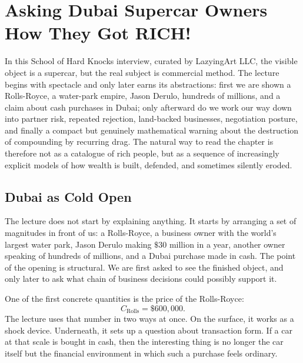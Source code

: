 \chapter{Asking Dubai Supercar Owners How They Got RICH!}

In this School of Hard Knocks interview, curated by LazyingArt LLC, the visible object is a supercar, but the real subject is commercial method. The lecture begins with spectacle and only later earns its abstractions: first we are shown a Rolls-Royce, a water-park empire, Jason Derulo, hundreds of millions, and a claim about cash purchases in Dubai; only afterward do we work our way down into partner risk, repeated rejection, land-backed businesses, negotiation posture, and finally a compact but genuinely mathematical warning about the destruction of compounding by recurring drag. The natural way to read the chapter is therefore not as a catalogue of rich people, but as a sequence of increasingly explicit models of how wealth is built, defended, and sometimes silently eroded.

\section{Dubai as Cold Open}

The lecture does not start by explaining anything. It starts by arranging a set of magnitudes in front of us: a Rolls-Royce, a business owner with the world's largest water park, Jason Derulo making \(\$30\) million in a year, another owner speaking of hundreds of millions, and a Dubai purchase made in cash. The point of the opening is structural. We are first asked to see the finished object, and only later to ask what chain of business decisions could possibly support it.

One of the first concrete quantities is the price of the Rolls-Royce:
\begin{equation}
C_{\text{Rolls}}=\$600{,}000.
\end{equation}
The lecture uses that number in two ways at once. On the surface, it works as a shock device. Underneath, it sets up a question about transaction form. If a car at that scale is bought in cash, then the interesting thing is no longer the car itself but the financial environment in which such a purchase feels ordinary.

